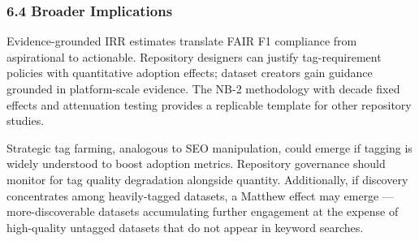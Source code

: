 \subsubsection{6.4 Broader Implications}

Evidence-grounded IRR estimates translate FAIR F1 compliance from aspirational to actionable. Repository designers can justify tag-requirement policies with quantitative adoption effects; dataset creators gain guidance grounded in platform-scale evidence. The NB-2 methodology with decade fixed effects and attenuation testing provides a replicable template for other repository studies.

Strategic tag farming, analogous to SEO manipulation, could emerge if tagging is widely understood to boost adoption metrics. Repository governance should monitor for tag quality degradation alongside quantity. Additionally, if discovery concentrates among heavily-tagged datasets, a Matthew effect may emerge --- more-discoverable datasets accumulating further engagement at the expense of high-quality untagged datasets that do not appear in keyword searches.

